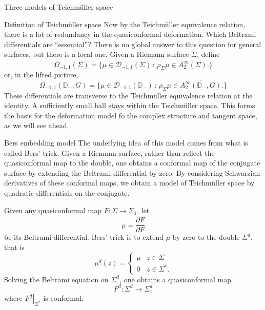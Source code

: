 \documentclass[12pt]{amsart}
\newcommand{\disk}{\ensuremath{\mathbb{D}} } %
\newcommand{\riem}{\Sigma}  %
\theoremstyle{plain}
\theoremstyle{definition}
\theoremstyle{remark}
\numberwithin{equation}{section} %
\numberwithin{figure}{section} %
\begin{document}
\begin{section}{Three models of Teichm\"uller space}
\begin{subsection}{Definition of Teichm\"uller space}
Now by the Teichm\"uller equivalence relation, there is a lot of redundancy in the quasiconformal deformation. Which Beltrami differentials are ``essential''?  There is no global answer to this question for general surfaces, but there is a local one.  
Given a Riemann surface $\riem$, define
\begin{equation} \label{eq:harmonic_Beltrami_definition}
  \Omega_{-1,1}(\riem) = \{ \mu \in \mathscr{D}_{-1,1}(\riem) \,: \,  \rho_\riem \mu \in \overline{A^\infty_2(\riem)}.  \}  
\end{equation}
or, in the lifted picture, 
\begin{equation*}  
  \Omega_{-1,1}(\disk_-,G) = \{ \mu \in \mathscr{D}_{-1,1}(\disk_-) \,: \,  \rho_\riem \mu \in \overline{A^\infty_2(\disk_-,G)}.  \}  
\end{equation*}
These differentials are transverse to the Teichm\"uller equivalence relation at the identity. A sufficiently small ball stays within the Teichm\"uller space. This forms the basis for the deformation model fo the complex structure and tangent space, as we will see ahead.  
 \end{subsection}
 \begin{subsection}{Bers embedding model}\label{Berstrick}
   The underlying idea of this model comes from what is called Bers' trick. Given a Riemann surface, rather than reflect the quasiconformal map to the double, one obtains a conformal map of the conjugate surface by extending the Beltrami differential by zero. By considering Schwarzian derivatives of these conformal maps, we obtain a model of Teichm\"uller space by quadratic differentials on the conjugate.
   
   Given any quasiconformal map $F:\riem \rightarrow \riem_1$, let 
   \[  \mu = \frac{\overline{\partial} F}{\partial F}  \]  be its Beltrami differential. Bers' trick is to extend $\mu$ by zero to the double $\riem^d$, that is
   \[  {\mu}^d(z)  = \left\{ \begin{array}{ll} \mu & z \in \riem \\ 0 & z \in \riem^*. \end{array} \right. \]
   Solving the Beltrami equation on $\riem^d$, one obtains a quasiconformal map 
   \begin{equation} \label{eq:Bers_trick}
     {F}^d: \riem^d \rightarrow \riem^d_1 
   \end{equation}
   where $\left. {F}^d \right|_{\riem^*}$ is conformal. 


\end{subsection}
\end{section}
\end{document}
